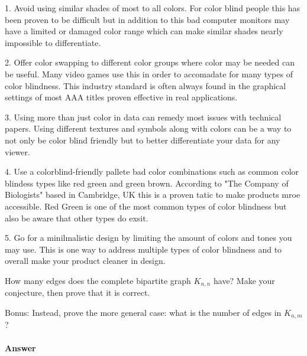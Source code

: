 \documentclass{article}
\begin{document}
{

1. Avoid using similar shades of most to all colors. For color blind people this has been proven to be difficult but in addition to this bad computer monitors may have a limited or damaged color range which can make similar shades nearly impossible to differentiate.

2. Offer color swapping to different color groups where color may be needed can be useful. Many video games use this in order to accomadate for many types of color blindness. This industry standard is often always found in the graphical settings of most AAA titles proven effective in real applications.

3. Using more than just color in data can remedy most issues with technical papers. Using different textures and symbols along with colors can be a way to not only be color blind friendly but to better differentiate your data for any viewer. 

4. Use a colorblind-friendly pallete bad color combinations such as common color blindess types like red green and green brown. According to "The Company of Biologists" based  in Cambridge, UK this is a proven tatic to make products mroe accessible. Red Green is one of the most common types of color blindness but also be aware that other types do exsit.

5. Go for a minilmalistic design by limiting the amount of colors and tones you may use. This is one way to address multiple types of color blindness and to overall make your product cleaner in design.

}



 

How many edges does the complete bipartite graph $K_{n,n}$ have?  Make your
conjecture, then prove that it is correct.

Bonus: Instead, prove the more general case:
what is the number of edges in $K_{n,m}$?

\paragraph{Answer}
\end{document}

